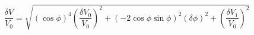\begin{equation}
\label{eq:delta_V_Malus}
\frac{\delta V}{V_0} = \sqrt{ {\left(\cos{\phi}\right)}^4\left(\frac{\delta V_0}{V_0}\right)^2 + \left(-2 \cos{\phi}\sin{\phi} \right)^2(\delta \phi)^2+ \left(\frac{\delta V_1}{V_0}\right)^2}
\end{equation}